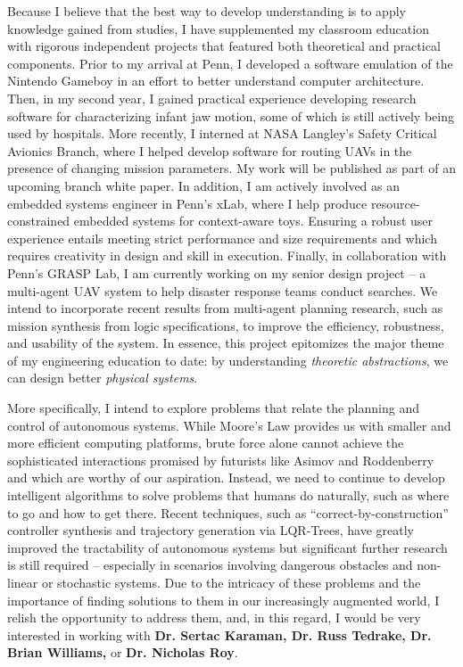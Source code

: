 \documentclass[]{letter}
\begin{document}
Because I believe that the best way to develop understanding is to apply knowledge gained from studies, I have supplemented my classroom education with rigorous independent projects that featured both theoretical and practical components. Prior to my arrival at Penn, I developed a software emulation of the Nintendo Gameboy in an effort to better understand computer architecture. Then, in my second year, I gained practical experience developing research software for characterizing infant jaw motion, some of which is still actively being used by hospitals. More recently, I interned at NASA Langley's Safety Critical Avionics Branch, where I helped develop software for routing UAVs in the presence of changing mission parameters. My work will be published as part of an upcoming branch white paper. In addition, I am actively involved as an embedded systems engineer in Penn’s xLab, where I help produce resource-constrained embedded systems for context-aware toys.  Ensuring a robust user experience entails meeting strict performance and size requirements and which requires creativity in design and skill in execution. Finally, in collaboration with Penn's GRASP Lab, I am currently working on my senior design project -- a multi-agent UAV system to help disaster response teams conduct searches. We intend to incorporate recent results from multi-agent planning research, such as mission synthesis from logic specifications, to improve the efficiency, robustness, and usability of the system. In essence, this project epitomizes the major theme of my engineering education to date: by understanding \emph{theoretic abstractions}, we can design better \emph{physical systems}.


More specifically, I intend to explore problems that relate the planning and control of autonomous systems.  While Moore's Law provides us with smaller and more efficient computing platforms, brute force alone cannot achieve the sophisticated interactions promised by futurists like Asimov and Roddenberry and which are worthy of our aspiration.  Instead, we need to continue to develop intelligent algorithms to solve problems that humans do naturally, such as where to go and how to get there.  Recent techniques, such as “correct-by-construction” controller synthesis and trajectory generation via LQR-Trees, have greatly improved the tractability of autonomous systems but significant further research is still required -- especially in scenarios involving dangerous obstacles and non-linear or stochastic systems. 
 Due to the intricacy of these problems and the importance of finding solutions to them in our increasingly augmented world, I relish the opportunity to address them, and, in this regard, I would be very interested in working with {\bf{Dr. Sertac Karaman, Dr. Russ Tedrake, Dr. Brian Williams,}} or {\bfseries{Dr. Nicholas Roy}}.
\end{document}
